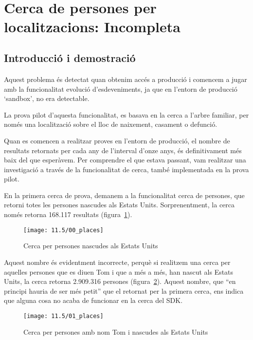 \section{Cerca de persones per localitzacions: Incompleta}

\subsection{Introducció i demostració}

\paragraph{}
Aquest problema és detectat quan obtenim accés a producció i comencem a jugar amb la funcionalitat evolució d'esdeveniments, ja que en l'entorn de producció `sandbox', no era detectable.

La prova pilot d'aquesta funcionalitat, es basava en la cerca a l'arbre familiar, per només una localització sobre el lloc de naixement, casament o defunció.

Quan es comencen a realitzar proves en l'entorn de producció, el nombre de resultats retornats per cada any de l'interval d'onze anys, és definitivament més baix del que esperàvem. Per comprendre el que estava passant, vam realitzar una investigació a través de la funcionalitat de cerca, també implementada en la prova pilot.

En la primera cerca de prova, demanem a la funcionalitat cerca de persones, que retorni totes les persones nascudes als Estats Units. Sorprenentment, la cerca només retorna 168.117 resultats (figura~\ref{fig:searchStates}).

\begin{figure}[h]
    \texttt{[image: 11.5/00\_places]}
    \centering
    \caption{Cerca per persones nascudes als Estats Units}\label{fig:searchStates}
\end{figure}

Aquest nombre és evidentment incorrecte, perquè si realitzem una cerca per aquelles persones que es diuen Tom i que a més a més, han nascut als Estats Units, la cerca retorna 2.909.316 persones (figura~\ref{fig:searchTom}). Aquest nombre, que ``en principi hauria de ser més petit'' que el retornat per la primera cerca, ens indica que alguna cosa no acaba de funcionar en la cerca del SDK.

\begin{figure}[h]
    \texttt{[image: 11.5/01\_places]}
    \centering
    \caption{Cerca per persones amb nom Tom i nascudes als Estats Units}\label{fig:searchTom}
\end{figure}

